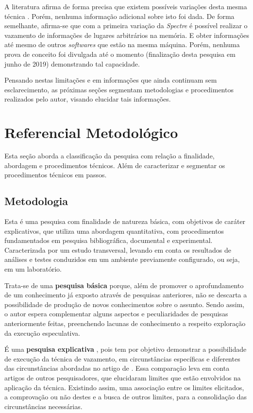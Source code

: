 \documentclass[
	article,			    %
	12pt,				    %
	oneside,			    %
	a4paper,			    %
	chapter=TITLE,		    %
	section=TITLE,		    %
	subsection=TITLE,	    %
	english,			    %
	brazil,				    %
	sumario=tradicional
]{abntex2}
\begin{document}
A literatura afirma de forma precisa que existem possíveis variações desta mesma técnica \cite{Kocher2018Spectre}. Porém, nenhuma informação adicional sobre isto foi dada. De forma semelhante, afirma-se que com a primeira variação da \emph{Spectre} é possível realizar o vazamento de informações de lugares arbitrários na memória. E obter informações até mesmo de outros \emph{softwares} que estão na mesma máquina. Porém, nenhuma prova de conceito foi divulgada até o momento (finalização desta pesquisa em junho de 2019) demonstrando tal capacidade.

Pensando nestas limitações e em informações que ainda continuam sem esclarecimento, as próximas seções segmentam metodologias e procedimentos realizados pelo autor, visando elucidar tais informações.

\section{Referencial Metodológico}
Esta seção aborda a classificação da pesquisa com relação a finalidade, abordagem e procedimentos técnicos. Além de caracterizar e segmentar os procedimentos técnicos em passos.
\subsection{Metodologia}
Esta é uma pesquisa com finalidade de natureza básica, com objetivos de caráter explicativos, que utiliza uma abordagem quantitativa, com procedimentos fundamentados em pesquisa bibliográfica, documental e experimental. Caracterizada por um estudo transversal, levando em conta os resultados de análises e testes conduzidos em um ambiente previamente configurado, ou seja, em um laboratório.

Trata-se de uma \textbf{pesquisa básica} \cite{Priscilla2017Metodologia} porque, além de promover o aprofundamento de um conhecimento já exposto através de pesquisas anteriores, não se descarta a possibilidade de produção de novos conhecimentos sobre o assunto. Sendo assim, o autor espera complementar alguns aspectos e peculiaridades de pesquisas anteriormente feitas, preenchendo lacunas de conhecimento a respeito exploração da execução especulativa.

É uma \textbf{pesquisa explicativa} \cite{Rocha2016Dom}, pois tem por objetivo demonstrar a possibilidade de execução da técnica de vazamento, em circunstâncias específicas e diferentes das circunstâncias abordadas no artigo de . Essa comparação leva em conta artigos de outros pesquisadores, que elucidaram limites que estão envolvidos na aplicação da técnica. Existindo assim, uma associação entre os limites elicitados, a comprovação ou não destes e a busca de outros limites, para a consolidação das circunstâncias necessárias.
\end{document}
